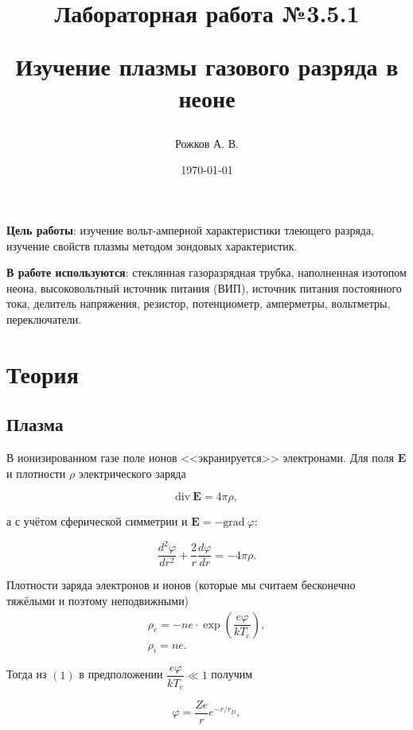 \documentclass[a4paper, 12pt]{article}
\title{\begin{center}Лабораторная работа №3.5.1\end{center}
Изучение плазмы газового разряда в неоне}
\author{Рожков А. В.}
\date{\today}
\begin{document}
    \maketitle
    \newpage

    \textbf{Цель работы}: изучение вольт-амперной характеристики тлеющего разряда, изучение свойств плазмы методом зондовых характеристик.


    \textbf{В работе используются}: стеклянная газоразрядная трубка, наполненная изотопом неона, высоковольтный источник питания (ВИП), источник питания постоянного тока, делитель напряжения, резистор, потенциометр, амперметры, вольтметры, переключатели.
    \section*{Теория}

        \subsection*{Плазма}

            В ионизированном газе поле ионов <<экранируется>> электронами. Для поля $\mathbf{E}$ и плотности $\rho$ электрического заряда

            $$
                \text{div}~\mathbf{E} = 4 \pi \rho,
            $$

            а с учётом сферической симметрии и $\mathbf{E} = -\text{grad}~\varphi$:

            \begin{equation}
                \dfrac{d^2 \varphi}{dr^2}+\dfrac{2}{r}\dfrac{d\varphi}{dr}=-4\pi \rho.
            \end{equation}

            Плотности заряда электронов и ионов (которые мы считаем бесконечно тяжёлыми и поэтому неподвижными)
            \begin{equation}
                \begin{array}{c}
                    \rho_e = -ne \cdot \exp\left(\dfrac{e\varphi}{kT_e}\right),\\
                    \rho_i = ne.
                \end{array}
            \end{equation}

            Тогда из $(1)$ в предположении $\dfrac{e\varphi}{kT_e} \ll 1$ получим

            \begin{equation}
                \varphi = \dfrac{Ze}{r}e^{-r/r_D},
            \end{equation}
\end{document}
